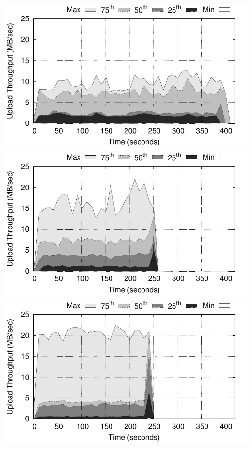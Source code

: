 \vspace{20pt}
\hspace*{-\parindent}
\begin{minipage}{\linewidth}
  \centering
  \begin{minipage}{0.3\linewidth}
    \captionsetup{font=scriptsize}
    \includegraphics[width=\linewidth]{Figures/plots/secure_streams/throughput/tput_tx_percentiles_1-workers}
    \includegraphics[width=\linewidth]{Figures/plots/secure_streams/throughput/tput_tx_percentiles_2-workers}
    \includegraphics[width=\linewidth]{Figures/plots/secure_streams/throughput/tput_tx_percentiles_4-workers}

\end{minipage}
\end{minipage}
